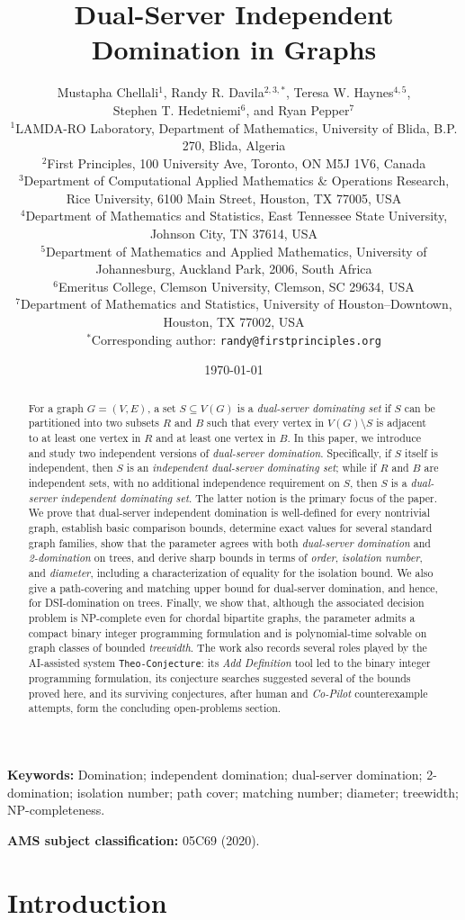 \documentclass[11pt]{article}
\title{Dual-Server Independent Domination in Graphs}
\author{%
\begin{tabular}{>{\centering\arraybackslash}p{0.94\textwidth}}
Mustapha Chellali\({}^{1}\), Randy R. Davila\({}^{2,3,*}\), Teresa W. Haynes\({}^{4,5}\),\\
Stephen T. Hedetniemi\({}^{6}\), and Ryan Pepper\({}^{7}\)\\[0.75em]
\small \({}^{1}\)LAMDA-RO Laboratory, Department of Mathematics, University of Blida, B.P. 270, Blida, Algeria\\
\small \({}^{2}\)First Principles, 100 University Ave, Toronto, ON M5J 1V6, Canada\\
\small \({}^{3}\)Department of Computational Applied Mathematics \& Operations Research, Rice University, 6100 Main Street, Houston, TX 77005, USA\\
\small \({}^{4}\)Department of Mathematics and Statistics, East Tennessee State University, Johnson City, TN 37614, USA\\
\small \({}^{5}\)Department of Mathematics and Applied Mathematics, University of Johannesburg, Auckland Park, 2006, South Africa\\
\small \({}^{6}\)Emeritus College, Clemson University, Clemson, SC 29634, USA\\
\small \({}^{7}\)Department of Mathematics and Statistics, University of Houston--Downtown, Houston, TX 77002, USA\\[0.35em]
\small \({}^{*}\)Corresponding author: \texttt{randy@firstprinciples.org}
\end{tabular}}
\date{\today}
\theoremstyle{definition}
\theoremstyle{remark}
\DeclareRobustCommand{\TheoConjecture}{\texttt{Theo-Conjecture}}
\DeclareRobustCommand{\AddDefinition}{\emph{Add Definition}}
\DeclareRobustCommand{\CoPilot}{\emph{Co-Pilot}}
\begin{document}
\maketitle

\begin{abstract}
For a graph \(G=(V,E)\), a set \(S\subseteq V(G)\) is a \emph{dual-server dominating set} if
\(S\) can be partitioned into two subsets \(R\) and \(B\) such that every
vertex in \(V(G)\setminus S\) is adjacent to at least one vertex in \(R\) and at
least one vertex in \(B\). In this paper, we introduce and study two
independent versions of \emph{dual-server domination}. Specifically, if
\(S\) itself is independent, then \(S\) is an \emph{independent dual-server dominating set}; while if \(R\) and \(B\)
are independent sets, with no additional independence requirement on \(S\),
then \(S\) is a \emph{dual-server independent dominating set}. The latter notion is
the primary focus of the paper.  We prove that dual-server independent domination is well-defined for every nontrivial graph, establish basic comparison bounds, determine exact values for several
standard graph families, show that the parameter agrees with both
\emph{dual-server domination} and \emph{2-domination} on trees, and derive
sharp bounds in terms of \emph{order}, \emph{isolation number}, and
\emph{diameter}, including a characterization of equality for the isolation
bound. We also give a path-covering and matching upper bound for
dual-server domination, and hence, for DSI-domination on trees. Finally, we
show that, although the associated decision problem is NP-complete even for
chordal bipartite graphs, the parameter admits a compact binary integer programming
formulation and is polynomial-time solvable on graph classes of bounded
\emph{treewidth}. The work also records several roles played by the
AI-assisted system \TheoConjecture: its \AddDefinition{} tool led to the
binary integer programming formulation, its conjecture searches suggested
several of the bounds proved here, and its surviving conjectures, after
human and \CoPilot{} counterexample attempts, form the concluding
open-problems section.
\end{abstract}

\textbf{Keywords:} Domination; independent domination; dual-server domination;
2-domination; isolation number; path cover; matching number; diameter;
treewidth; NP-completeness.

\textbf{AMS subject classification:} 05C69 (2020).

\section{Introduction}
\end{document}
